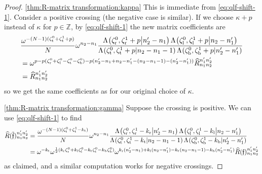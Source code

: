 \documentclass{sl2ams}
\numberwithin{equation}{section}
\newcommand{\ZZ}{\mathbb{Z}}
\begin{document}
\begin{proof}
  \ref{thm:R-matrix transformation:kappa}
  This is immediate from \cref{eq:qlf-shift-1}.
  Consider a positive crossing (the negative case is similar).
  If we choose \(\kappa + p\) instead of \(\kappa\) for \(p \in \ZZ\), by \eqref{eq:qlf-shift-1} the new matrix coefficients are
  \begin{align*}
      &
      \frac{
        \omega^{-(\nr-1)(\zeta_{\lW}^0 + \zeta_{\lW}^1 + p)}
      }{
        \nr
      }
      \omega^{n_2 - n_1}
      \frac{
        \qlf{\zeta_{\lN}^0, \zeta_{\lN}^1 + p}{n_2' - n_1}
        \qlf{\zeta_{\lS}^0, \zeta_{\lS}^1 + p}{n_2 - n_1'}
        }{
          \qlf{\zeta_{\lW}^0, \zeta_{\lW}^1 + p}{n_2 - n_1 - 1}
          \qlf{\zeta_{\lE}^0, \zeta_{\lE}^1 + p}{n_2' - n_1'}
      }
      \\
      &=
      \omega^{p - p(\zeta_{\lN}^0 + \zeta_{\lS}^0 - \zeta_{\lW}^0 - \zeta_{\lE}^0) - p(n_2' - n_1 + n_2 - n_1' - (n_2 - n_1 - 1) -(n_2' - n_1'))}
      \rmat{n_1}{n_2}{n_1'}{n_2'}
      \\
      &=
      \rmat{n_1}{n_2}{n_1'}{n_2'}
  \end{align*}
  so we get the same coefficients as for our original choice of \(\kappa\).

  \ref{thm:R-matrix transformation:gamma}
  Suppose the crossing is positive.
  We can use \cref{eq:qlf-shift-1} to find
  \begin{align*}
    \rmat[\tilde{\mathfrak{f}}]{n_1}{n_2}{n_1'}{n_2'}
    &=
    \frac{
      \omega^{-(\nr-1)(\zeta_{\lW}^0 + \zeta_{\lW}^1 - k_{\lW})}
    }{
      \nr
    }
    \omega^{n_2 - n_1}
    \frac{
      \qlf{\zeta_{\lN}^0, \zeta_{\lN}^1 - k_{\lN}}{n_2' - n_1}
      \qlf{\zeta_{\lS}^0, \zeta_{\lS}^1 - k_{\lS}}{n_2 - n_1'}
    }{
      \qlf{\zeta_{\lW}^0, \zeta_{\lW}^1 - k_{\lW}}{n_2 - n_1 - 1}
      \qlf{\zeta_{\lE}^0, \zeta_{\lE}^1 - k_{\lE}}{n_2' - n_1'}
    }
    \\
    &=
    \omega^{- k_{\lW}}
    \omega^{
      \frac{1}{2}
      (
      k_{\lN}\zeta_{\lN}^{0}
      +
      k_{\lS}\zeta_{\lS}^{0}
      -
      k_{\lW}\zeta_{\lW}^{0}
      -
      k_{\lE}\zeta_{\lE}^{0}
      )
    }
    \omega^{
      k_{\lN}(n_{2}' - n_{1})
      +
      k_{\lS}(n_{2} - n_{1}')
      -
      k_{\lW}(n_{2} - n_{1} - 1)
      -
      k_{\lE}(n_{2}' - n_{1}')
    }
    \rmat[\mathfrak{f}]{n_1}{n_2}{n_1'}{n_2'}
  \end{align*}
  as claimed, and a similar computation works for negative crossings.


\end{proof}
\end{document}

